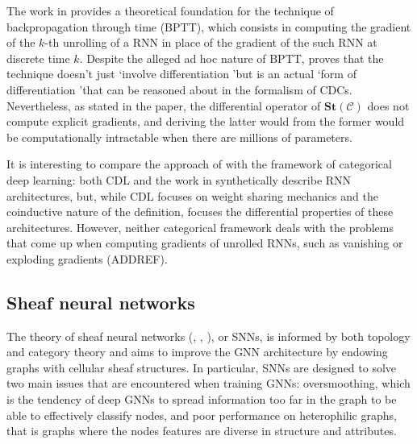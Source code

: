 \documentclass[11pt,a4paper,openright,twoside]{report}
\theoremstyle{plain}
\theoremstyle{definition}
\begin{document}
The work in \cite{sprunger2019differentiable} provides a theoretical foundation for the technique of backpropagation through time (BPTT), which consists in computing the gradient of the $k$-th unrolling of a RNN in place of the gradient of the such RNN at discrete time $k$. Despite the alleged ad hoc nature of BPTT, \cite{sprunger2019differentiable} proves that the technique doesn't just \lq involve differentiation \rq but is an actual \lq form of differentiation \rq that can be reasoned about in the formalism of CDCs. Nevertheless, as stated in the paper, the differential operator of $\mathbf{St}(\mathcal{C})$ does not compute explicit gradients, and deriving the latter would from the former would be computationally intractable when there are millions of parameters. 


It is interesting to compare the approach of \cite{sprunger2019differentiable} with the framework of categorical deep learning: both CDL and the work in \cite{sprunger2019differentiable} synthetically describe RNN architectures, but, while CDL focuses on weight sharing mechanics and the coinductive nature of the definition, \cite{sprunger2019differentiable} focuses the differential properties of these architectures. However, neither categorical framework deals with the problems that come up when computing gradients of unrolled RNNs, such as vanishing or exploding gradients (ADDREF). 


\subsection{Sheaf neural networks}

The theory of sheaf neural networks (\cite{hansen2020sheaf}, \cite{bodnar2022neural}, \cite{zaghen2024nonlinear}), or SNNs, is informed by both topology and category theory and aims to improve the GNN architecture by endowing graphs with cellular sheaf structures. In particular, SNNs are designed to solve two main issues that are encountered when training GNNs: oversmoothing, which is the tendency of deep GNNs to spread information too far in the graph to be able to effectively classify nodes, and poor performance on heterophilic graphs, that is graphs where the nodes features are diverse in structure and attributes.
\end{document}
